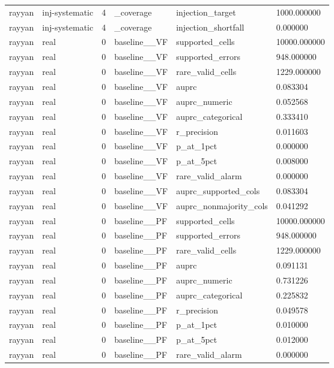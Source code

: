 \begin{tabular}{llllll}
rayyan & inj-systematic & 4 & \_coverage & injection\_target & 1000.000000 \\
rayyan & inj-systematic & 4 & \_coverage & injection\_shortfall & 0.000000 \\
rayyan & real & 0 & baseline\_\_VF & supported\_cells & 10000.000000 \\
rayyan & real & 0 & baseline\_\_VF & supported\_errors & 948.000000 \\
rayyan & real & 0 & baseline\_\_VF & rare\_valid\_cells & 1229.000000 \\
rayyan & real & 0 & baseline\_\_VF & auprc & 0.083304 \\
rayyan & real & 0 & baseline\_\_VF & auprc\_numeric & 0.052568 \\
rayyan & real & 0 & baseline\_\_VF & auprc\_categorical & 0.333410 \\
rayyan & real & 0 & baseline\_\_VF & r\_precision & 0.011603 \\
rayyan & real & 0 & baseline\_\_VF & p\_at\_1pct & 0.000000 \\
rayyan & real & 0 & baseline\_\_VF & p\_at\_5pct & 0.008000 \\
rayyan & real & 0 & baseline\_\_VF & rare\_valid\_alarm & 0.000000 \\
rayyan & real & 0 & baseline\_\_VF & auprc\_supported\_cols & 0.083304 \\
rayyan & real & 0 & baseline\_\_VF & auprc\_nonmajority\_cols & 0.041292 \\
rayyan & real & 0 & baseline\_\_PF & supported\_cells & 10000.000000 \\
rayyan & real & 0 & baseline\_\_PF & supported\_errors & 948.000000 \\
rayyan & real & 0 & baseline\_\_PF & rare\_valid\_cells & 1229.000000 \\
rayyan & real & 0 & baseline\_\_PF & auprc & 0.091131 \\
rayyan & real & 0 & baseline\_\_PF & auprc\_numeric & 0.731226 \\
rayyan & real & 0 & baseline\_\_PF & auprc\_categorical & 0.225832 \\
rayyan & real & 0 & baseline\_\_PF & r\_precision & 0.049578 \\
rayyan & real & 0 & baseline\_\_PF & p\_at\_1pct & 0.010000 \\
rayyan & real & 0 & baseline\_\_PF & p\_at\_5pct & 0.012000 \\
rayyan & real & 0 & baseline\_\_PF & rare\_valid\_alarm & 0.000000 \\

\end{tabular}
